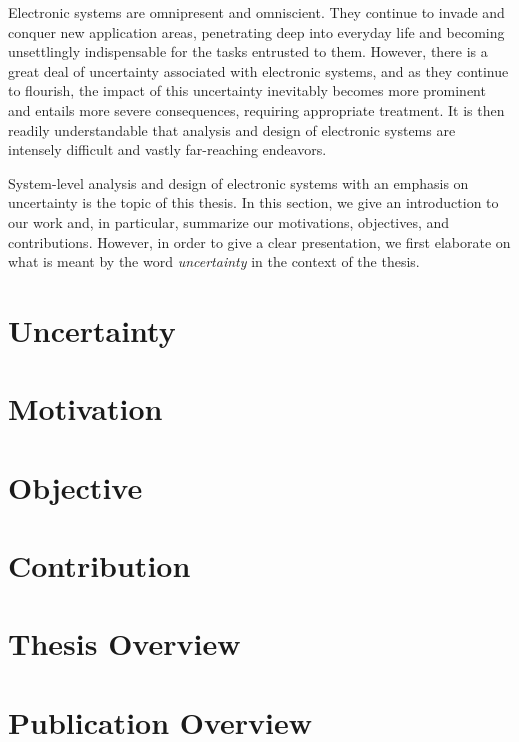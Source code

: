 Electronic systems are omnipresent and omniscient. They continue to invade and
conquer new application areas, penetrating deep into everyday life and becoming
unsettlingly indispensable for the tasks entrusted to them. However, there is a
great deal of uncertainty associated with electronic systems, and as they
continue to flourish, the impact of this uncertainty inevitably becomes more
prominent and entails more severe consequences, requiring appropriate treatment.
It is then readily understandable that analysis and design of electronic systems
are intensely difficult and vastly far-reaching endeavors.

System-level analysis and design of electronic systems with an emphasis on
uncertainty is the topic of this thesis. In this section, we give an
introduction to our work and, in particular, summarize our motivations,
objectives, and contributions. However, in order to give a clear presentation,
we first elaborate on what is meant by the word \emph{uncertainty} in the
context of the thesis.

\section{Uncertainty}

\section{Motivation}

\section{Objective}

\section{Contribution}

\section{\pasttitle}

\section{Thesis Overview}

\section{Publication Overview}
